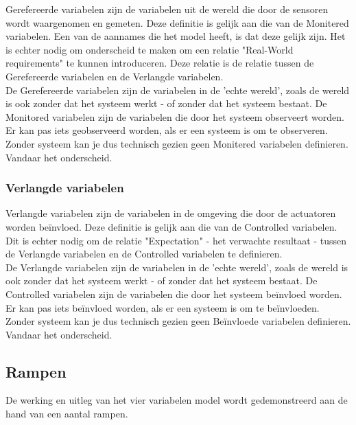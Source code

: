 \documentclass{article}
\begin{document}
			Gerefereerde variabelen zijn de variabelen uit de wereld die door de sensoren wordt waargenomen en gemeten. Deze definitie is gelijk aan die van de Monitered variabelen. Een van de aannames die het model heeft, is dat deze gelijk zijn. Het is echter nodig om onderscheid te maken om een relatie "Real-World requirements" te kunnen introduceren. Deze relatie is de relatie tussen de Gerefereerde variabelen en de Verlangde variabelen. \\
			De Gerefereerde variabelen zijn de variabelen in de 'echte wereld', zoals de wereld is ook zonder dat het systeem werkt - of zonder dat het systeem bestaat. De Monitored variabelen zijn de variabelen die door het systeem observeert worden. Er kan pas iets geobserveerd worden, als er een systeem is om te observeren. Zonder systeem kan je dus technisch gezien geen Monitered variabelen definieren. Vandaar het onderscheid. \par
			
			\subsubsection{Verlangde variabelen}
			
			Verlangde variabelen zijn de variabelen in de omgeving die door de actuatoren worden beïnvloed. Deze definitie is gelijk aan die van de Controlled variabelen. Dit is echter nodig om de relatie "Expectation" - het verwachte resultaat - tussen de Verlangde variabelen en de Controlled variabelen te definieren. \\
			De Verlangde variabelen zijn de variabelen in de 'echte wereld', zoals de wereld is ook zonder dat het systeem werkt - of zonder dat het systeem bestaat. De Controlled variabelen zijn de variabelen die door het systeem beïnvloed worden. Er kan pas iets beïnvloed worden, als er een systeem is om te beïnvloeden. Zonder systeem kan je dus technisch gezien geen Beïnvloede variabelen definieren. Vandaar het onderscheid. \cite{icsoft-pt16} \par
		
		\subsection{Rampen}
		
		De werking en uitleg van het vier variabelen model wordt gedemonstreerd aan de hand van een aantal rampen. \par
		
\end{document}
